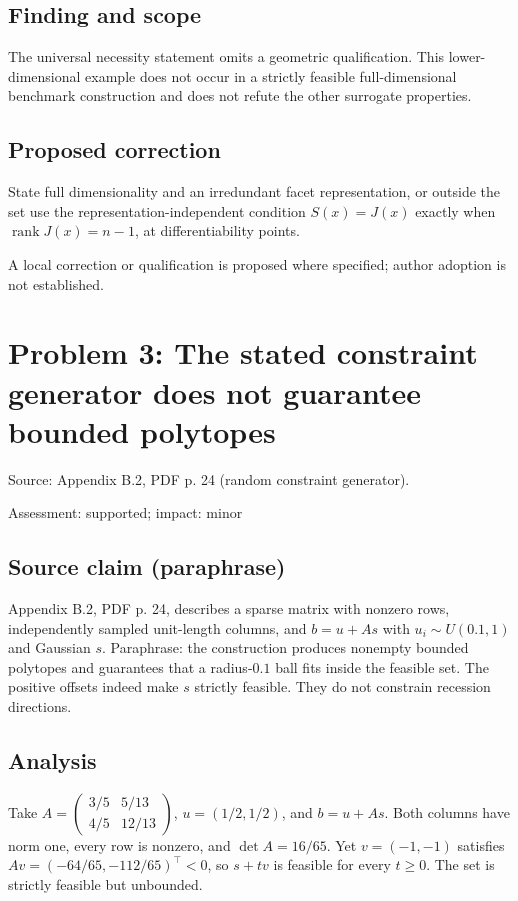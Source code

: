 \documentclass[11pt]{article}
\begin{document}
\subsection*{Finding and scope}

The universal necessity statement omits a geometric qualification. This lower-dimensional example does not occur in a strictly feasible full-dimensional benchmark construction and does not refute the other surrogate properties.

\subsection*{Proposed correction}

State full dimensionality and an irredundant facet representation, or outside the set use the representation-independent condition \(S(x)=J(x)\) exactly when \(\operatorname{rank}J(x)=n-1\), at differentiability points.

A local correction or qualification is proposed where specified; author adoption is not established.

\section*{Problem 3: The stated constraint generator does not guarantee bounded polytopes}

Source: Appendix B.2, PDF p. 24 (random constraint generator).

Assessment: supported; impact: minor

\subsection*{Source claim (paraphrase)}

Appendix B.2, PDF p. 24, describes a sparse matrix with nonzero rows, independently sampled unit-length columns, and \(b=u+As\) with \(u_i\sim U(0.1,1)\) and Gaussian \(s\). Paraphrase: the construction produces nonempty bounded polytopes and guarantees that a radius-\(0.1\) ball fits inside the feasible set. The positive offsets indeed make \(s\) strictly feasible. They do not constrain recession directions.

\subsection*{Analysis}

Take \(A=\begin{pmatrix}3/5&5/13\\4/5&12/13\end{pmatrix}\), \(u=(1/2,1/2)\), and \(b=u+As\). Both columns have norm one, every row is nonzero, and \(\det A=16/65\). Yet \(v=(-1,-1)\) satisfies \(Av=(-64/65,-112/65)^\top<0\), so \(s+tv\) is feasible for every \(t\ge0\). The set is strictly feasible but unbounded.
\end{document}

